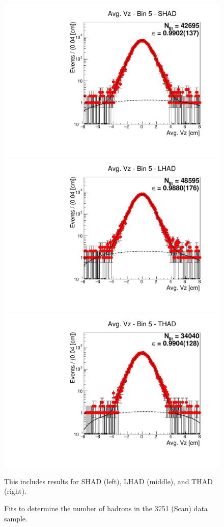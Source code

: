 \begin{figure}[H]
\centering
\includegraphics[scale=0.25]{figures/plots/nonDDbar_fit_results/scan/fit_scan_05_data_SHAD.pdf}
\hspace{-0.5cm}
\includegraphics[scale=0.25]{figures/plots/nonDDbar_fit_results/scan/fit_scan_05_data_LHAD.pdf}
\hspace{-0.5cm}
\includegraphics[scale=0.25]{figures/plots/nonDDbar_fit_results/scan/fit_scan_05_data_THAD.pdf}
\caption{Fits to determine the number of hadrons in the 3751 (Scan) data sample.}
{This includes results for SHAD (left), LHAD (middle), and THAD (right).}
\label{fig:hadron_fits_scan_05}
\end{figure}

